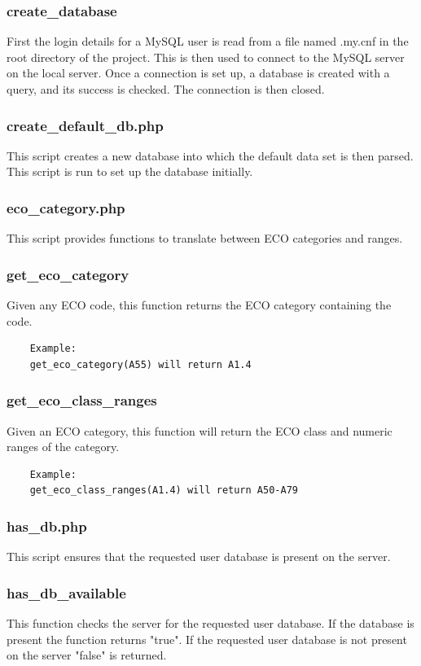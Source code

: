 \documentclass{article}
\begin{document}
\subsubsection*{create\_database}
First the login details for a MySQL user is read from a file named .my.cnf in the root directory of the project.  This is then used to connect to the MySQL server on the local server.  Once a connection is set up, a database is created with a query, and its success is checked.  The connection is then closed.


\subsubsection{create\_default\_db.php}
This script creates a new database into which the default data set is then parsed. This script is run to set up the database initially.


\subsubsection{eco\_category.php}
This script provides functions to translate between ECO categories and ranges.

\subsubsection*{get\_eco\_category}
Given any ECO code, this function returns the ECO category containing the code. 
\begin{lstlisting}
	Example:
	get_eco_category(A55) will return A1.4
\end{lstlisting}

\subsubsection*{get\_eco\_class\_ranges}
Given an ECO category, this function will return the ECO class and numeric ranges of the category.
\begin{lstlisting}
	Example:
	get_eco_class_ranges(A1.4) will return A50-A79
\end{lstlisting}


\subsubsection{has\_db.php}
This script ensures that the requested user database is present on the server.

\subsubsection*{has\_db\_available}
This function checks the server for the requested user database. If the database is present the function returns "true". If the requested user database is not present on the server "false" is returned.
\end{document}
